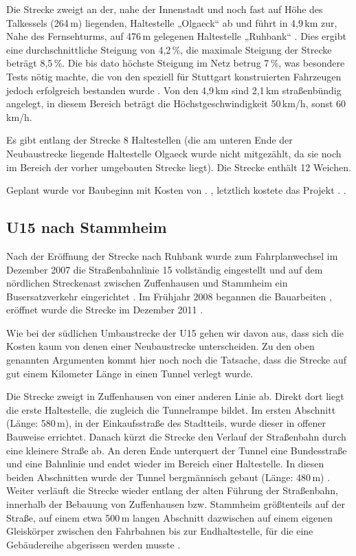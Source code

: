 Die Strecke zweigt an der, nahe der Innenstadt und noch fast auf Höhe des
Talkessels (264\,m) liegenden, Haltestelle „Olgaeck“ ab und führt in 4,9\,km
zur, Nahe des Fernsehturms, auf 476\,m gelegenen Haltestelle „Ruhbank“
\cite{u15vorinfo}. Dies ergibt eine durchschnittliche Steigung von 4,2\,\%,
die maximale Steigung der Strecke beträgt 8,5\,\%. Die bis dato höchste
Steigung im Netz betrug 7\,\%, was besondere Tests nötig machte, die von den
speziell für Stuttgart konstruierten Fahrzeugen jedoch erfolgreich bestanden
wurde \cite{u15vorinfo}. Von den 4,9\,km sind 2,1\,km straßenbündig
angelegt, in diesem Bereich beträgt die Höchstgeschwindigkeit 50\,km/h, sonst
60\,km/h.

Es gibt entlang der Strecke 8 Haltestellen \cite{u15splan} (die am unteren Ende
der Neubaustrecke liegende Haltestelle Olgaeck wurde nicht mitgezählt, da sie
noch im Bereich der vorher umgebauten Strecke liegt). Die Strecke enthält 12
Weichen.

Geplant wurde vor Baubeginn mit Kosten von . \cite{u15vorinfo},
letztlich kostete das Projekt . \cite{u15seb}.

\subsection*{U15 nach Stammheim}

Nach der Eröffnung der Strecke nach Ruhbank wurde zum Fahrplanwechsel im
Dezember 2007 die Straßenbahnlinie 15 vollständig eingestellt und auf dem
nördlichen Streckenast zwischen Zuffenhausen und Stammheim ein Busersatzverkehr
eingerichtet \cite{u15sv}.  Im Frühjahr 2008 begannen die Bauarbeiten
\cite{u15seb}, eröffnet wurde die Strecke im Dezember 2011 \cite{u15sv}.

Wie bei der südlichen Umbaustrecke der U15 gehen wir davon aus, dass sich die
Kosten kaum von denen einer Neubaustrecke unterscheiden. Zu den oben genannten
Argumenten kommt hier noch noch die Tatsache, dass die Strecke auf gut einem
Kilometer Länge in einen Tunnel verlegt wurde.

Die Strecke zweigt in Zuffenhausen von einer anderen Linie ab. Direkt dort liegt die erste Haltestelle, die zugleich die Tunnelrampe bildet. Im ersten Abschnitt (Länge: 580\,m), in der Einkaufsstraße des Stadtteils, wurde dieser in offener Bauweise errichtet.
Danach kürzt die Strecke den Verlauf der Straßenbahn durch eine kleinere Straße ab. An deren Ende unterquert der Tunnel eine Bundesstraße und eine Bahnlinie und endet wieder im Bereich einer Haltestelle. In diesen beiden Abschnitten wurde der Tunnel bergmännisch gebaut (Länge: 480\,m) \cite{u15mail} \cite{u15sv} \cite{u15nplan}.
Weiter verläuft die Strecke wieder entlang der alten Führung der Straßenbahn, innerhalb der Bebauung von Zuffenhausen bzw. Stammheim größtenteils auf der Straße, auf einem etwa 500\,m langen Abschnitt dazwischen auf einem eigenen Gleiskörper zwischen den Fahrbahnen \cite{u15nplan} bis zur Endhaltestelle, für die eine Gebäudereihe abgerissen werden musste \cite{u15sv}.

